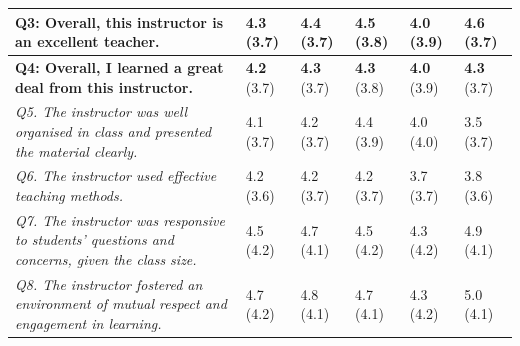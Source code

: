 \begin{table}[htb]
\begin{tabular}{@{}p{9cm}p{1.1cm}p{1.1cm}p{1.1cm}p{1.1cm}p{1.1cm}@{}}
\textbf{Q3: Overall, this instructor is an excellent teacher.} & \textbf{4.3} \newline (3.7) & \textbf{4.4} \newline (3.7)  & 
\textbf{4.5} \newline (3.8)  & \textbf{4.0} \newline (3.9) & \textbf{4.6} \newline (3.7)  \\ \midrule

\textbf{Q4: Overall, I learned a great deal from this instructor.} & \textbf{4.2} \newline (3.7) & \textbf{4.3} \newline (3.7)  & 
\textbf{4.3} \newline (3.8) & \textbf{4.0} \newline (3.9) & \textbf{4.3} \newline (3.7) \\ \midrule

\emph{Q5. The instructor was well organised in class and presented the material clearly.} & 4.1 \newline (3.7)  & 4.2 \newline (3.7)  & 4.4 \newline (3.9)  & 4.0 \newline (4.0) & 3.5 \newline (3.7) \\ \midrule

\emph{Q6. The instructor used effective teaching methods.} & 4.2 \newline (3.6)  & 4.2 \newline (3.7) & 
4.2 \newline (3.7)  & 3.7 \newline (3.7)  & 3.8 \newline (3.6) \\ \midrule

\emph{Q7. The instructor was responsive to students’ questions and concerns, given the class size.} & 4.5 \newline (4.2)  & 4.7 \newline (4.1) & 4.5 \newline (4.2)  & 4.3 \newline (4.2) & 4.9 \newline (4.1)  \\ \midrule

\emph{Q8. The instructor fostered an environment of mutual respect and engagement in learning.} & 4.7 \newline (4.2)  & 4.8 \newline (4.1) & 4.7 \newline (4.1)  & 4.3 \newline (4.2) & 5.0 \newline (4.1)  \\ \midrule


\end{tabular}
\end{table}
